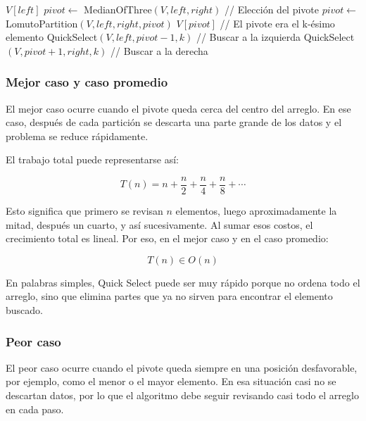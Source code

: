 \begin{algorithm}
    \caption{Quick Select $\triangleright$ $V[0..n-1]$}
    \begin{algorithmic}[1]
        \State \Return $V[left]$
        \EndIf
        \State $pivot \gets$ MedianOfThree$(V, left, right)$ // Elección del pivote
        \State $pivot \gets$ LomutoPartition$(V, left, right, pivot)$
        \State \Return $V[pivot]$ // El pivote era el k-ésimo elemento
        \State \Return QuickSelect$(V, left, pivot - 1, k)$ // Buscar a la izquierda
        \Else
        \State \Return QuickSelect$(V, pivot + 1, right, k)$ // Buscar a la derecha
        \EndIf
        \EndProcedure
    \end{algorithmic}
\end{algorithm}

\subsubsection{Mejor caso y caso promedio}

El mejor caso ocurre cuando el pivote queda cerca del centro del arreglo. En ese caso, después de cada partición se descarta una parte grande de los datos y el problema se reduce rápidamente.

El trabajo total puede representarse así:

\[
T(n)=n+\frac{n}{2}+\frac{n}{4}+\frac{n}{8}+\cdots
\]

Esto significa que primero se revisan $n$ elementos, luego aproximadamente la mitad, después un cuarto, y así sucesivamente. Al sumar esos costos, el crecimiento total es lineal. Por eso, en el mejor caso y en el caso promedio:

\[
T(n)\in O(n)
\]

En palabras simples, Quick Select puede ser muy rápido porque no ordena todo el arreglo, sino que elimina partes que ya no sirven para encontrar el elemento buscado.

\subsubsection{Peor caso}

El peor caso ocurre cuando el pivote queda siempre en una posición desfavorable, por ejemplo, como el menor o el mayor elemento. En esa situación casi no se descartan datos, por lo que el algoritmo debe seguir revisando casi todo el arreglo en cada paso.

